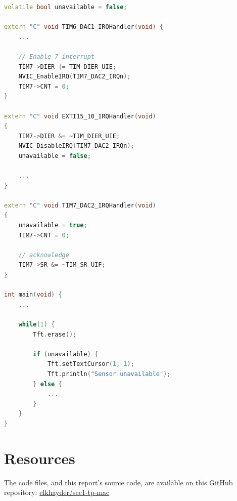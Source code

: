 \documentclass{article}
\begin{document}
\begin{lstlisting}[language=C++, caption={Sensor availability checker}]
volatile bool unavailable = false;

extern "C" void TIM6_DAC1_IRQHandler(void) {
    ...

    // Enable 7 interrupt
    TIM7->DIER |= TIM_DIER_UIE;
    NVIC_EnableIRQ(TIM7_DAC2_IRQn);
    TIM7->CNT = 0;
}

extern "C" void EXTI15_10_IRQHandler(void)
{
    TIM7->DIER &= ~TIM_DIER_UIE;
    NVIC_DisableIRQ(TIM7_DAC2_IRQn);
    unavailable = false;

    ...
}

extern "C" void TIM7_DAC2_IRQHandler(void)
{
    unavailable = true;
    TIM7->CNT = 0;

    // acknowledge
    TIM7->SR &= ~TIM_SR_UIF;
}

int main(void) {
    ...

    while(1) {
        Tft.erase();

        if (unavailable) {
            Tft.setTextCursor(1, 1);
            Tft.println("Sensor unavailable");
        } else {
            ...
        }
    }
}
\end{lstlisting}

\section*{Resources}
The code files, and this report's source code, are available on this GitHub repository: \href{https://github.com/elkhayder/sec1-tp-mac}{elkhayder/sec1-tp-mac} 
\end{document}
